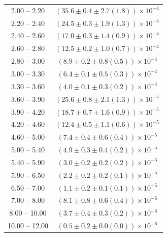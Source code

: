 \begin{table}
\begin{center}
\begin{tabular}{ c | c }
2.00 -- 2.20 & $(35.6\pm0.4\pm2.7(1.8))\times10^{-4}$ \\ 
2.20 -- 2.40 & $(24.5\pm0.3\pm1.9(1.3))\times10^{-4}$ \\ 
2.40 -- 2.60 & $(17.0\pm0.3\pm1.4(0.9))\times10^{-4}$ \\ 
2.60 -- 2.80 & $(12.5\pm0.2\pm1.0(0.7))\times10^{-4}$ \\ 
2.80 -- 3.00 & $(8.9\pm0.2\pm0.8(0.5))\times10^{-4}$ \\ 
3.00 -- 3.30 & $(6.4\pm0.1\pm0.5(0.3))\times10^{-4}$ \\ 
3.30 -- 3.60 & $(4.0\pm0.1\pm0.3(0.2))\times10^{-4}$ \\ 
3.60 -- 3.90 & $(25.6\pm0.8\pm2.1(1.3))\times10^{-5}$ \\ 
3.90 -- 4.20 & $(18.7\pm0.7\pm1.6(0.9))\times10^{-5}$ \\ 
4.20 -- 4.60 & $(12.4\pm0.5\pm1.1(0.6))\times10^{-5}$ \\ 
4.60 -- 5.00 & $(7.4\pm0.4\pm0.6(0.4))\times10^{-5}$ \\ 
5.00 -- 5.40 & $(4.9\pm0.3\pm0.4(0.2))\times10^{-5}$ \\ 
5.40 -- 5.90 & $(3.0\pm0.2\pm0.2(0.2))\times10^{-5}$ \\ 
5.90 -- 6.50 & $(2.2\pm0.2\pm0.2(0.1))\times10^{-5}$ \\ 
6.50 -- 7.00 & $(1.1\pm0.2\pm0.1(0.1))\times10^{-5}$ \\ 
7.00 -- 8.00 & $(8.1\pm0.8\pm0.6(0.4))\times10^{-6}$ \\ 
8.00 -- 10.00 & $(3.7\pm0.4\pm0.3(0.2))\times10^{-6}$ \\ 
10.00 -- 12.00 & $(0.5\pm0.2\pm0.0(0.0))\times10^{-6}$ \\ 
\hline
\end{tabular}
\end{center}
\end{table}
 
